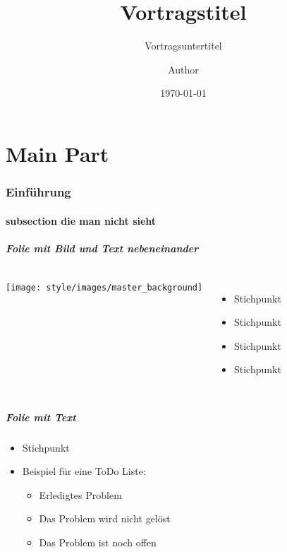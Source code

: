 
\usepackage{style/pdfpc-commands}
\usepackage{style/clear}

 
\title{Vortragstitel}
\subtitle{Vortragsuntertitel}
\author{Author}
\date{\today}
\setDualView
{}


\frame{\titlepage}%


\part{Main Part}

\section{Einführung}
\subsection*{subsection die man nicht sieht}%
\begin{frame}
\frametitle{Folie mit Bild und Text nebeneinander}
\vskip5mm
 \begin{columns}
    \column{6cm}
 	  \texttt{[image: style/images/master\_background]}
     \column{5cm}
      \vspace{-1cm}%
	\begin{itemize}
		 \itemsep1.2em
      	 \item Stichpunkt
      	 \item Stichpunkt
       	 \item Stichpunkt
     	 \item Stichpunkt
     \end{itemize}
 \end{columns}
\end{frame}

\begin{frame}
	\frametitle{Folie mit Text}
	\vskip5mm
	\vspace{-0.4cm}%
	\begin{itemize}
		\itemsep1.2em
		\item Stichpunkt
		\item Beispiel für eine ToDo Liste:
		\begin{itemize}
			\itemsep1.2em
			\item[\done] Erledigtes Problem
			\item[\wontfix] Das Problem wird nicht gelöst
			\item[\open] Das Problem ist noch offen
		\end{itemize}
	\end{itemize}
\end{frame}

